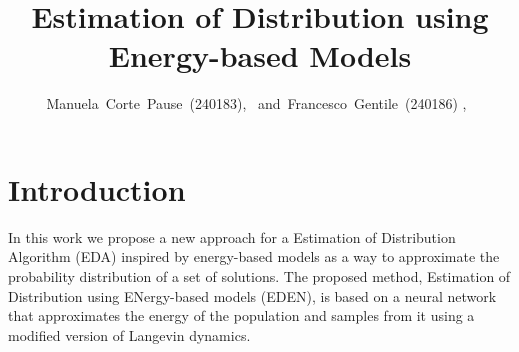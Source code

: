 \documentclass[journal]{IEEEtran}
\begin{document}
\title{Estimation of Distribution using Energy-based Models}
%
%
%

\author{Manuela~Corte~Pause~(240183),~
  and~Francesco~Gentile~(240186) ,~%
}

\maketitle

\IEEEpeerreviewmaketitle

\section{Introduction}
In this work we propose a new approach for a Estimation of Distribution Algorithm (EDA) inspired by energy-based models as a way to approximate the probability distribution of a set of solutions. The proposed method, Estimation of Distribution using ENergy-based models (EDEN), is based on a neural network that approximates the energy of the population and samples from it using a modified version of Langevin dynamics.







\ifCLASSOPTIONcaptionsoff
  \newpage
\fi




%
%


\end{document}
